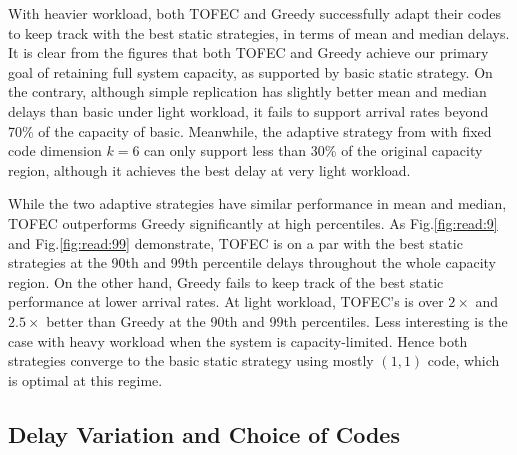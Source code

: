 \documentclass[journal]{IEEEtran}
\newcommand{\comment}[1]{}
\newcommand{\ourproposal}{TOFEC\xspace}
\newcommand{\twowidth}{0.45\columnwidth}
\newcommand{\shrinkbeforecaption}{-5pt}
\newcommand{\shrinkaftercaption}{-14pt}
\begin{document}
With heavier workload, both \ourproposal and Greedy successfully adapt their codes to keep track with the best static strategies, in terms of mean and median delays. It is clear from the figures that both \ourproposal and Greedy achieve our primary goal of retaining full system capacity, as supported by basic static strategy. On the contrary, although simple replication has slightly better mean and median delays than basic under light workload, it fails to support arrival rates beyond 70\% of the capacity of basic.
Meanwhile, the adaptive strategy from \cite{fastcloud} with fixed code dimension $k=6$ can only support less than 30\% of the original capacity region, although it achieves the best delay at very light workload.

\comment{
\begin{figure}[t]
	\subfigure[Average $k$]{
		\label{fig:read:codeDim}
		\texttt{[image: read\_codeDim]}
	}\subfigure[Average $n$]{
		\label{fig:read:codeLength}
		\texttt{[image: read\_codeLength]}
	}
\vspace{\shrinkbeforecaption}
\caption{Delay performance in read only scenario}
\label{fig:read:code}
\vspace{\shrinkaftercaption}
\end{figure}
}

While the two adaptive strategies have similar performance in mean and median, \ourproposal outperforms Greedy significantly at high percentiles. As Fig.\ref{fig:read:9} and Fig.\ref{fig:read:99} demonstrate, \ourproposal is on a par with the best static strategies at the 90th and 99th percentile delays throughout the whole capacity region. On the other hand, Greedy fails to keep track of the best static performance at lower arrival rates. At light workload, \ourproposal 's is over $2\times$ and $2.5\times$ better than Greedy at the 90th and 99th percentiles. Less interesting is the case with heavy workload when the system is capacity-limited. Hence both strategies converge to the basic static strategy using mostly $(1,1)$ code, which is optimal at this regime.




\subsection{Delay Variation and Choice of Codes}

\comment{
In Fig.\ref{fig:read:codeDim} and Fig.\ref{fig:read:codeLength} we plot the average code dimension $k$ and code length $n$ in \ourproposal and Greedy, as well as the code used by the static strategies that produce the best mean delay at different arrival rates. These figures again confirm that the adaptation algorithms of \ourproposal and Greedy are working as they are designed to: the average code dimension and length both match with the best static strategies quite well. Greedy is a bit too aggressive in choosing code dimension when compared with the best static strategy: the average code dimension of Greedy is always at least as large as that of the best static strategy. On the contrary,  \ourproposal's choice of code dimension turns out to be a better interpolation of the best static strategy.
}
\end{document}
